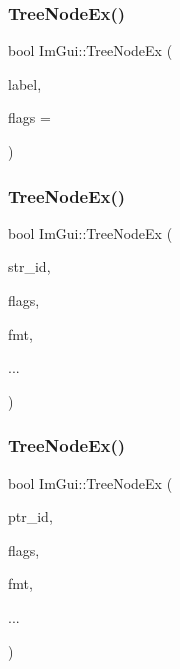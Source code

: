 \hypertarget{namespace_im_gui_a21f62e092dac9556a15a8edee2f70522}{}\label{namespace_im_gui_a21f62e092dac9556a15a8edee2f70522} 
\subsubsection{\texorpdfstring{Tree\+Node\+Ex()}{TreeNodeEx()}\hspace{0.1cm}{\footnotesize\ttfamily [1/3]}}
{\footnotesize\ttfamily bool Im\+Gui\+::\+Tree\+Node\+Ex (\begin{DoxyParamCaption}\item[{const char $\ast$}]{label,  }\item[{Im\+Gui\+Tree\+Node\+Flags}]{flags = {} }\end{DoxyParamCaption})}

\hypertarget{namespace_im_gui_a9ca2fae922b38cfddc3259f874c18a5d}{}\label{namespace_im_gui_a9ca2fae922b38cfddc3259f874c18a5d} 
\subsubsection{\texorpdfstring{Tree\+Node\+Ex()}{TreeNodeEx()}\hspace{0.1cm}{\footnotesize\ttfamily [2/3]}}
{\footnotesize\ttfamily bool Im\+Gui\+::\+Tree\+Node\+Ex (\begin{DoxyParamCaption}\item[{const char $\ast$}]{str\+\_\+id,  }\item[{Im\+Gui\+Tree\+Node\+Flags}]{flags,  }\item[{const char $\ast$}]{fmt,  }\item[{}]{... }\end{DoxyParamCaption})}

\hypertarget{namespace_im_gui_adce362ad94baa9b00f5914cbcab00452}{}\label{namespace_im_gui_adce362ad94baa9b00f5914cbcab00452} 
\subsubsection{\texorpdfstring{Tree\+Node\+Ex()}{TreeNodeEx()}\hspace{0.1cm}{\footnotesize\ttfamily [3/3]}}
{\footnotesize\ttfamily bool Im\+Gui\+::\+Tree\+Node\+Ex (\begin{DoxyParamCaption}\item[{const void $\ast$}]{ptr\+\_\+id,  }\item[{Im\+Gui\+Tree\+Node\+Flags}]{flags,  }\item[{const char $\ast$}]{fmt,  }\item[{}]{... }\end{DoxyParamCaption})}

